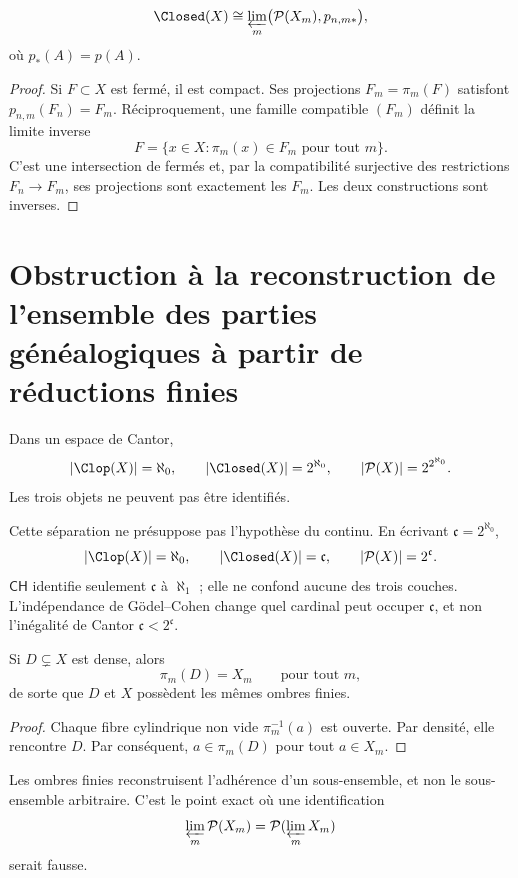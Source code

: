 \begin{theorem}
\label{p3-83-c45-s2:thm:closed-power}
\[
  \Closed(X)
  \cong
  \varprojlim_m\bigl(\mathcal P(X_m),p_{n,m*}\bigr),
\]
où \(p_*(A)=p(A)\).
\end{theorem}

\begin{proof}
Si \(F\subset X\) est fermé, il est compact. Ses projections
\(F_m=\pi_m(F)\) satisfont \(p_{n,m}(F_n)=F_m\). Réciproquement, une famille
compatible \((F_m)\) définit la limite inverse
\[
  F=\{x\in X:\pi_m(x)\in F_m\text{ pour tout }m\}.
\]
C'est une intersection de fermés et, par la compatibilité surjective des
restrictions \(F_n\to F_m\), ses projections sont exactement les \(F_m\).
Les deux constructions sont inverses.
\end{proof}

\section{Obstruction à la reconstruction de l'ensemble des parties généalogiques à partir de réductions finies}

Dans un espace de Cantor,
\[
 |\Clop(X)|=\aleph_0,
 \qquad
 |\Closed(X)|=2^{\aleph_0},
 \qquad
 |\mathcal P(X)|=2^{2^{\aleph_0}}.
\]
Les trois objets ne peuvent pas être identifiés.

Cette séparation ne présuppose pas l'hypothèse du continu. En écrivant
\(\mathfrak c=2^{\aleph_0}\),
\[
 |\Clop(X)|=\aleph_0,\qquad
 |\Closed(X)|=\mathfrak c,\qquad
 |\mathcal P(X)|=2^{\mathfrak c}.
\]
\(\mathsf{CH}\) identifie seulement \(\mathfrak c\) à \(\aleph_1\) ; elle ne
confond aucune des trois couches. L'indépendance de Gödel--Cohen change quel
cardinal peut occuper \(\mathfrak c\), et non l'inégalité de Cantor
\(\mathfrak c<2^{\mathfrak c}\).

\begin{proposition}
Si \(D\subsetneq X\) est dense, alors
\[
  \pi_m(D)=X_m
  \qquad\text{pour tout }m,
\]
de sorte que \(D\) et \(X\) possèdent les mêmes ombres finies.
\end{proposition}

\begin{proof}
Chaque fibre cylindrique non vide \(\pi_m^{-1}(a)\) est ouverte. Par densité,
elle rencontre \(D\). Par conséquent, \(a\in\pi_m(D)\) pour tout \(a\in X_m\).
\end{proof}

Les ombres finies reconstruisent l'adhérence d'un sous-ensemble, et non le
sous-ensemble arbitraire. C'est le point exact où une identification
\[
  \varprojlim_m\mathcal P(X_m)
  =
  \mathcal P(\varprojlim_mX_m)
\]
serait fausse.

